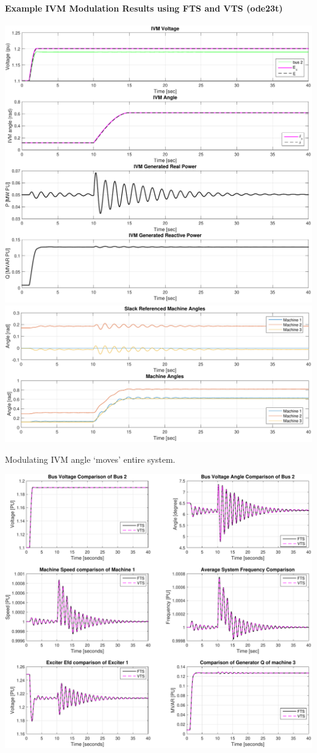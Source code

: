 \documentclass[12pt]{article}
\begin{document}
\onehalfspacing
\paragraph{Example IVM Modulation Results using FTS and VTS (ode23t)}
\begin{center}
\includegraphics[width=.9\linewidth]{IVM-simoutput}\\
\includegraphics[width=.9\linewidth]{IVM-angleComp}
\end{center}
Modulating IVM angle `moves' entire system.

\pagebreak


\includegraphics[width=\linewidth]{IVM-VTScomp}\\
\end{document}
